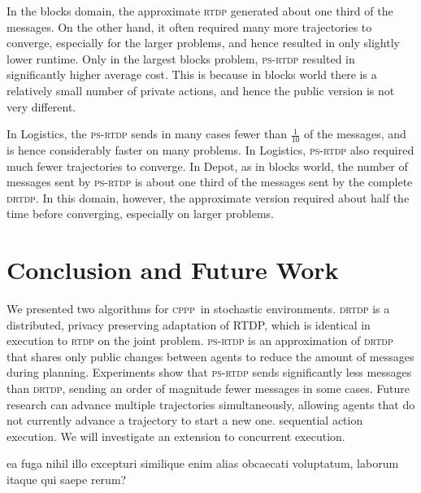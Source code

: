 \documentclass[letterpaper]{article} %
\newcommand{\mafs}{\textsc {mafs}\xspace}
\newcommand{\cppp}{\textsc {cppp}\xspace}
\newcommand{\rtdp}{\textsc {rtdp}\xspace}
\newcommand{\drtdp}{\textsc {drtdp}\xspace}
\newcommand{\psrtdp}{\textsc{ps}-\textsc{rtdp}\xspace}
\theoremstyle{remark}
\begin{document}
In the blocks domain, the approximate \rtdp generated about one third of the messages. On the other hand, it often required many more trajectories to converge, especially for the larger problems, and hence resulted in only slightly lower runtime. Only in the largest blocks problem, \psrtdp resulted in significantly higher average cost. This is because in blocks world there is a relatively small number of private actions, and hence the public version is not very different.

In Logistics, the \psrtdp sends in many cases fewer than $\frac{1}{10}$ of the messages, and is hence considerably faster on many problems. In Logistics, \psrtdp also required much fewer trajectories to converge.
In Depot, as in blocks world, the number of messages sent by \psrtdp is about one third of the messages sent by the complete \drtdp. In this domain, however, the approximate version required about half the time before converging, especially on larger problems.


\section{Conclusion and Future Work}
We presented two algorithms for \cppp\ in stochastic environments. \drtdp is a distributed, privacy preserving adaptation of RTDP, which is identical in execution to \rtdp on the joint problem. %
\psrtdp is an approximation of \drtdp that shares only public changes between agents to reduce the amount of messages during planning. Experiments show that \psrtdp sends significantly less messages than \drtdp,
sending an order of magnitude fewer messages in some cases. %
Future research can advance multiple trajectories simultaneously, allowing agents that do not currently advance a trajectory to start a new one. %
 sequential action execution. We will investigate an extension to concurrent execution.



 ea fuga nihil illo excepturi similique enim alias obcaecati voluptatum, laborum itaque qui saepe rerum?\clearpage

\end{document}

